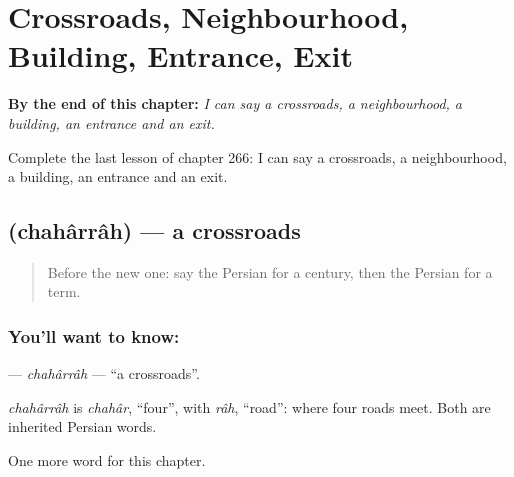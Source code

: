 
\chapter{Crossroads, Neighbourhood, Building, Entrance, Exit}
\label{ch:fa-crossroads-neighbourhood-building-entrance-exit}

\begin{chapteropening}
\textbf{By the end of this chapter:} \emph{I can say a crossroads, a neighbourhood, a building, an entrance and an exit.}

Complete the last lesson of chapter 266: I can say a crossroads, a neighbourhood, a building, an entrance and an exit.
\end{chapteropening}

\section[\texorpdfstring{\fa{چهارراه} (chahârrâh)}{چهارراه (chahârrâh)}]{ (chahârrâh) — a crossroads}

\label{lesson:FA-C266-chaharrah}



\begin{quote}
Before the new one: say the Persian for a century, then the Persian for a term.
\end{quote}

\subsection*{You'll want to know: }
\textbf{} — \emph{chahârrâh} — \textquotedblleft{}a crossroads\textquotedblright{}.

\begin{cousinweb}
\emph{chahârrâh} is \emph{chahâr}, \textquotedblleft{}four\textquotedblright{}, with \emph{râh}, \textquotedblleft{}road\textquotedblright{}: where four roads meet. Both are inherited Persian words.
\end{cousinweb}

\begin{grammarlens}[title={What you've built}]
One more word for this chapter.
\end{grammarlens}

